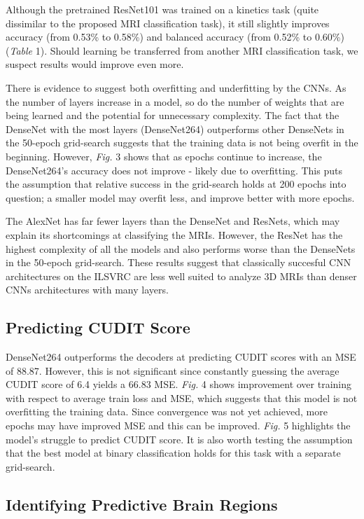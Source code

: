 \documentclass[conference]{IEEEtran}
\begin{document}
Although the pretrained ResNet101 was trained on a kinetics task (quite dissimilar to the proposed MRI classification task), it still slightly improves accuracy (from 0.53\% to 0.58\%) and balanced accuracy (from 0.52\% to 0.60\%) (\textit{Table} 1). Should learning be transferred from another MRI classification task, we suspect results would improve even more. 

There is evidence to suggest both overfitting and underfitting by the CNNs. As the number of layers increase in a model, so do the number of weights that are being learned and the potential for unnecessary complexity. The fact that the DenseNet with the most layers (DenseNet264) outperforms other DenseNets in the 50-epoch grid-search suggests that the training data is not being overfit in the beginning. However, \textit{Fig.} 3 shows that as epochs continue to increase, the DenseNet264's accuracy does not improve - likely due to overfitting. This puts the assumption that relative success in the grid-search holds at 200 epochs into question; a smaller model may overfit less, and improve better with more epochs. 

The AlexNet has far fewer layers than the DenseNet and ResNets, which may explain its shortcomings at classifying the MRIs. However, the ResNet has the highest complexity of all the models and also performs worse than the DenseNets in the 50-epoch grid-search. These results suggest that classically succesful CNN architectures on the ILSVRC are less well suited to analyze 3D MRIs than denser CNNs architectures with many layers.


\subsection{Predicting CUDIT Score}

DenseNet264 outperforms the decoders at predicting CUDIT scores with an MSE of 88.87. However, this is not significant since constantly guessing the average CUDIT score of 6.4 yields a 66.83 MSE. \textit{Fig.} 4 shows improvement over training with respect to average train loss and MSE, which suggests that this model is not overfitting the training data. Since convergence was not yet achieved, more epochs may have improved MSE and this can be improved. \textit{Fig.} 5 highlights the model's struggle to predict CUDIT score. It is also worth testing the assumption that the best model at binary classification holds for this task with a separate grid-search.

\subsection{Identifying Predictive Brain Regions}
\end{document}
